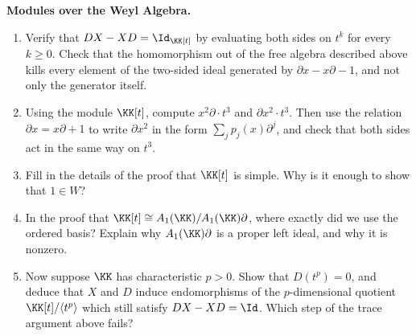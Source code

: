 \documentclass[12pt,reqno]{amsart}
\begin{document}
\begin{problems}
\item\label{h:weyl-modules} \textbf{Modules over the Weyl Algebra.}
\begin{enumerate}
\item Verify that $DX-XD=\Id_{\KK[t]}$ by evaluating both sides on $t^k$ for every $k\geq0$. Check that the homomorphism out of the free algebra described above kills every element of the two-sided ideal generated by $\partial x-x\partial-1$, and not only the generator itself.
\item Using the module $\KK[t]$, compute $x^2\partial\cdot t^3$ and $\partial x^2\cdot t^3$. Then use the relation $\partial x=x\partial+1$ to write $\partial x^2$ in the form $\sum_jp_j(x)\partial^j$, and check that both sides act in the same way on $t^3$.
\item Fill in the details of the proof that $\KK[t]$ is simple. Why is it enough to show that $1\in W$?
\item In the proof that $\KK[t]\cong A_1(\KK)/A_1(\KK)\partial$, where exactly did we use the ordered basis? Explain why $A_1(\KK)\partial$ is a proper left ideal, and why it is nonzero.
\item Now suppose $\KK$ has characteristic $p>0$. Show that $D(t^p)=0$, and deduce that $X$ and $D$ induce endomorphisms of the $p$-dimensional quotient $\KK[t]/\langle t^p\rangle$ which still satisfy $DX-XD=\Id$. Which step of the trace argument above fails?
\end{enumerate}
\end{problems}

\hrulefill
\end{document}
